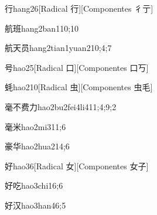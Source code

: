 \begin{verbete}{行}{hang2}{6}[Radical 行][Componentes 彳亍]
\end{verbete}

\begin{verbete}{航班}{hang2ban1}{10;10}
\end{verbete}

\begin{verbete}{航天员}{hang2tian1yuan2}{10;4;7}
\end{verbete}

\begin{verbete}{号}{hao2}{5}[Radical 口][Componentes 口丂]
\end{verbete}

\begin{verbete}{蚝}{hao2}{10}[Radical 虫][Componentes 虫毛]
\end{verbete}

\begin{verbete}{毫不费力}{hao2bu2fei4li4}{11;4;9;2}
\end{verbete}

\begin{verbete}{毫米}{hao2mi3}{11;6}
\end{verbete}

\begin{verbete}{豪华}{hao2hua2}{14;6}
\end{verbete}

\begin{verbete}{好}{hao3}{6}[Radical ⼥][Componentes ⼥⼦]
\end{verbete}

\begin{verbete}{好吃}{hao3chi1}{6;6}
\end{verbete}

\begin{verbete}{好汉}{hao3han4}{6;5}
\end{verbete}

